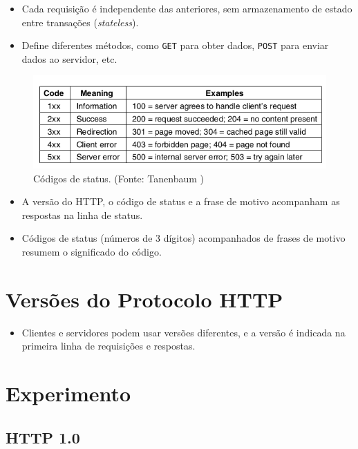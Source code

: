 \documentclass{article}
\begin{document}
\begin{itemize}
    \item Cada requisição é independente das anteriores, sem armazenamento de estado
          entre transações (\textit{stateless}).
    \item Define diferentes métodos, como \texttt{GET} para obter dados, \texttt{POST}
          para enviar dados ao servidor, etc.
\end{itemize}

\begin{figure}[H]
    \centering
    \includegraphics[width=\textwidth]{./assets/1141.png}
    \caption{Códigos de status. (Fonte: Tanenbaum \cite{tanenbaum})}
\end{figure}

\begin{itemize}
    \item A versão do HTTP, o código de status e a frase de motivo acompanham as
          respostas na linha de status.
    \item Códigos de status (números de 3 dígitos) acompanhados de frases de motivo
          resumem o significado do código.
\end{itemize}

\section{Versões do Protocolo HTTP}

\begin{itemize}
    \item Clientes e servidores podem usar versões diferentes, e a versão é indicada na
          primeira linha de requisições e respostas.
\end{itemize}

\section{Experimento}

\subsection{HTTP 1.0}
\end{document}
